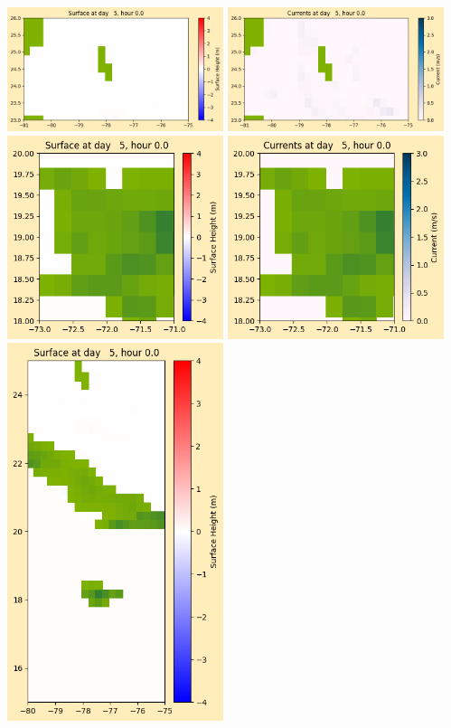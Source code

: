 \documentclass[11pt]{article}
\begin{document}
\vskip 10pt 
\includegraphics[width=0.475\textwidth]{frame0032fig1003.png}
\includegraphics[width=0.475\textwidth]{frame0032fig1004.png}
\vskip 10pt 
\includegraphics[width=0.475\textwidth]{frame0032fig1005.png}
\includegraphics[width=0.475\textwidth]{frame0032fig1006.png}
\vskip 10pt 
\includegraphics[width=0.475\textwidth]{frame0032fig1007.png}
\end{document}
